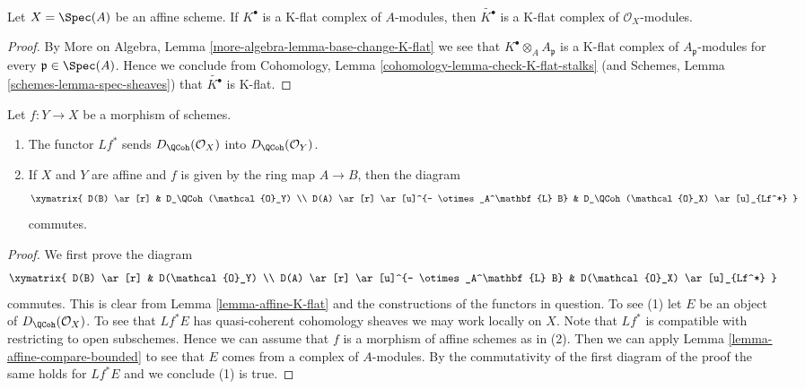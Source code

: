 \begin{lemma}
\label{lemma-affine-K-flat}
Let $X = \Spec(A)$ be an affine scheme. If $K^\bullet$ is a K-flat
complex of $A$-modules, then $\widetilde{K^\bullet}$ is a K-flat
complex of $\mathcal{O}_X$-modules.
\end{lemma}

\begin{proof}
By More on Algebra, Lemma \ref{more-algebra-lemma-base-change-K-flat}
we see that $K^\bullet \otimes_A A_\mathfrak p$ is a K-flat complex
of $A_\mathfrak p$-modules for every $\mathfrak p \in \Spec(A)$.
Hence we conclude from
Cohomology, Lemma \ref{cohomology-lemma-check-K-flat-stalks}
(and
Schemes, Lemma \ref{schemes-lemma-spec-sheaves})
that $\widetilde{K^\bullet}$ is K-flat.
\end{proof}

\begin{lemma}
\label{lemma-quasi-coherence-pullback}
Let $f : Y \to X$ be a morphism of schemes.
\begin{enumerate}
\item The functor $Lf^*$ sends $D_\QCoh(\mathcal{O}_X)$
into $D_\QCoh(\mathcal{O}_Y)$.
\item If $X$ and $Y$ are affine and $f$ is given by the ring map
$A \to B$, then the diagram
$$
\xymatrix{
D(B) \ar[r] & D_\QCoh(\mathcal{O}_Y) \\
D(A) \ar[r] \ar[u]^{- \otimes_A^\mathbf{L} B} &
D_\QCoh(\mathcal{O}_X) \ar[u]_{Lf^*}
}
$$
commutes.
\end{enumerate}
\end{lemma}

\begin{proof}
We first prove the diagram
$$
\xymatrix{
D(B) \ar[r] & D(\mathcal{O}_Y) \\
D(A) \ar[r] \ar[u]^{- \otimes_A^\mathbf{L} B} &
D(\mathcal{O}_X) \ar[u]_{Lf^*}
}
$$
commutes. This is clear from Lemma \ref{lemma-affine-K-flat} and
the constructions of the functors in question. To see (1) let
$E$ be an object of $D_\QCoh(\mathcal{O}_X)$. To see that
$Lf^*E$ has quasi-coherent cohomology sheaves we may work locally on $X$.
Note that $Lf^*$ is compatible with restricting to open subschemes.
Hence we can assume that $f$ is a morphism of affine schemes as in (2).
Then we can apply Lemma \ref{lemma-affine-compare-bounded} to see that
$E$ comes from a complex of $A$-modules. By the commutativity of the first
diagram of the proof the same holds for $Lf^*E$ and we conclude (1) is true.
\end{proof}

